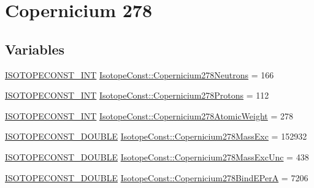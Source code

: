 \hypertarget{group___isotope_const-_copernicium-_cn278}{}\section{Copernicium 278}
\label{group___isotope_const-_copernicium-_cn278}
\subsection*{Variables}
\begin{DoxyCompactItemize}
\item 
\mbox{\hyperlink{group___isotope_const-_macros_ga5f18360b3e99483a35c32d789e62621c}{I\+S\+O\+T\+O\+P\+E\+C\+O\+N\+S\+T\+\_\+\+I\+NT}} \mbox{\hyperlink{group___isotope_const-_copernicium-_cn278_ga4d3ea929056efd254f6fed70c3927b9b}{Isotope\+Const\+::\+Copernicium278\+Neutrons}} = 166
\item 
\mbox{\hyperlink{group___isotope_const-_macros_ga5f18360b3e99483a35c32d789e62621c}{I\+S\+O\+T\+O\+P\+E\+C\+O\+N\+S\+T\+\_\+\+I\+NT}} \mbox{\hyperlink{group___isotope_const-_copernicium-_cn278_gacd31c10965a0630d53f470d17ceb6779}{Isotope\+Const\+::\+Copernicium278\+Protons}} = 112
\item 
\mbox{\hyperlink{group___isotope_const-_macros_ga5f18360b3e99483a35c32d789e62621c}{I\+S\+O\+T\+O\+P\+E\+C\+O\+N\+S\+T\+\_\+\+I\+NT}} \mbox{\hyperlink{group___isotope_const-_copernicium-_cn278_gaea1798e1f7219ac55835a3724ae53bea}{Isotope\+Const\+::\+Copernicium278\+Atomic\+Weight}} = 278
\item 
\mbox{\hyperlink{group___isotope_const-_macros_ga8f45a7272ce02c0b4c65c44636ed719a}{I\+S\+O\+T\+O\+P\+E\+C\+O\+N\+S\+T\+\_\+\+D\+O\+U\+B\+LE}} \mbox{\hyperlink{group___isotope_const-_copernicium-_cn278_gae4b37cdc420efaebe37d6c67a0efd6b4}{Isotope\+Const\+::\+Copernicium278\+Mass\+Exc}} = 152932
\item 
\mbox{\hyperlink{group___isotope_const-_macros_ga8f45a7272ce02c0b4c65c44636ed719a}{I\+S\+O\+T\+O\+P\+E\+C\+O\+N\+S\+T\+\_\+\+D\+O\+U\+B\+LE}} \mbox{\hyperlink{group___isotope_const-_copernicium-_cn278_ga67dc320ffe5497a3af91acc557bea739}{Isotope\+Const\+::\+Copernicium278\+Mass\+Exc\+Unc}} = 438
\item 
\mbox{\hyperlink{group___isotope_const-_macros_ga8f45a7272ce02c0b4c65c44636ed719a}{I\+S\+O\+T\+O\+P\+E\+C\+O\+N\+S\+T\+\_\+\+D\+O\+U\+B\+LE}} \mbox{\hyperlink{group___isotope_const-_copernicium-_cn278_gaf5e566af1f5e47cee0f9eeb4873a613d}{Isotope\+Const\+::\+Copernicium278\+Bind\+E\+PerA}} = 7206

\end{DoxyCompactItemize}
